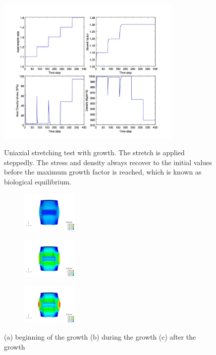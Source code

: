 \documentclass[12pt]{article}
\begin{document}
\begin{figure}[H]
	\centering
	\includegraphics[width=0.8\textwidth]{./figs/stretch.jpg}
	\label{fig:uniaxial}
	\caption{Uniaxial stretching test with growth. The stretch is applied steppedly. The stress and density always recover to the initial values before the maximum growth factor is reached, which is known as biological equilibrium.}
	\label{fig:growth_results}
\end{figure}

\begin{figure}[H]
	\centering
	\begin{subfigure}
		\centering
		\includegraphics[width=0.3\textwidth, height=0.3\textheight]{./figs/step1.jpg}
		\label{fig:step1}
	\end{subfigure}
	\begin{subfigure}
		\centering
		\includegraphics[width=0.3\textwidth, height=0.3\textheight]{./figs/step5.jpg}
		\label{fig:step5}
	\end{subfigure}
	\begin{subfigure}
		\centering
		\includegraphics[width=0.3\textwidth, height=0.3\textheight]{./figs/step15.jpg}
		\label{fig:step15}
	\end{subfigure}
	\caption{(a) beginning of the growth (b) during the growth (c) after the growth}
	\label{fig:growth_stent}
\end{figure}
\end{document}
